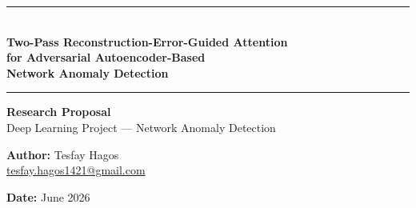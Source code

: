 \documentclass[12pt,a4paper]{article}
\begin{document}
\begin{titlepage}
\centering
\vspace*{1cm}

{\color{darkblue}\rule{\linewidth}{2pt}}\\[0.5em]
{\LARGE\bfseries\color{darkblue}
Two-Pass Reconstruction-Error-Guided Attention\\[0.3em]
for Adversarial Autoencoder-Based\\[0.3em]
Network Anomaly Detection}\\[0.3em]
{\color{darkblue}\rule{\linewidth}{2pt}}

\vspace{1.5cm}

{\large\textbf{Research Proposal}}\\[0.5em]
{\normalsize Deep Learning Project --- Network Anomaly Detection}

\vspace{1.5cm}

{\large\textbf{Author:} Tesfay Hagos}\\[0.3em]
{\normalsize \href{mailto:tesfay.hagos1421@gmail.com}{tesfay.hagos1421@gmail.com}}

\vspace{0.8cm}
{\normalsize \textbf{Date:} June 2026}

\vspace{2cm}

\begin{abstract}
\noindent
Network intrusion detection requires identifying rare, unseen attack patterns in
high-dimensional traffic data with minimal or no labels.
Established unsupervised approaches on the KDD99 benchmark---deep autoencoders
\citep{ae_analysis_nids} and GAN-based discriminator scoring \citep{alad}---share
two structural limitations: all input features are treated uniformly regardless
of their discriminative relevance, and the latent representation is unconstrained,
making anomaly reasoning in latent space ill-defined.

This proposal describes an architectural experiment that addresses both limitations
through a single novel mechanism: \textbf{Two-Pass Reconstruction-Error-Guided Attention
(RE-Attention)}.
In the first pass, a standard encoder--decoder reconstructs the input; the
per-feature reconstruction error vector is then used as the attention signal to
re-weight the input for a second encoding pass whose latent code is regularised
by an adversarial Gaussian prior.
This creates a self-corrective feedback loop in which the model identifies its
own reconstruction failures and attends to them, enabling a richer and more
targeted anomaly representation than input-driven or bottleneck-driven attention
reported in prior work \citep{attention_ae_latent,vae_attention_lstm}.
A controlled five-condition ablation study isolates the contribution of each
component, and the attention weights are visualised per attack family to provide
interpretable insights into which network traffic features most strongly signal
each class of intrusion.
\end{abstract}


\end{titlepage}
\end{document}
